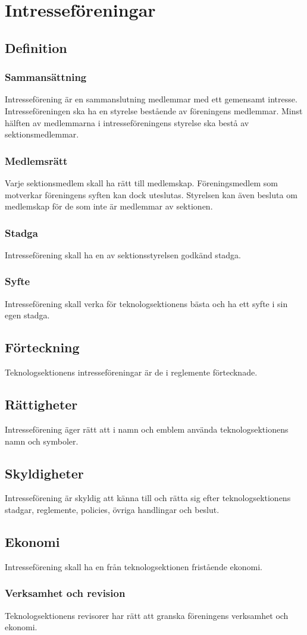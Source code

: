 \section{Intresseföreningar}

\subsection{Definition}

\subsubsection{Sammansättning}
Intresseförening är en sammanslutning medlemmar med ett gemensamt intresse. Intresseföreningen ska ha en styrelse bestående av föreningens medlemmar. Minst hälften av medlemmarna i intresseföreningens styrelse ska bestå av sektionsmedlemmar.

\subsubsection{Medlemsrätt}
Varje sektionsmedlem skall ha rätt till medlemskap. Föreningsmedlem som motverkar föreningens syften kan dock uteslutas. Styrelsen kan även besluta om medlemskap för de som inte är medlemmar av sektionen.

\subsubsection{Stadga}
Intresseförening skall ha en av sektionsstyrelsen godkänd stadga.

\subsubsection{Syfte}
Intresseförening skall verka för teknologsektionens bästa och ha ett syfte i sin egen stadga.

\subsection{Förteckning}
Teknologsektionens intresseföreningar är de i reglemente förtecknade.

\subsection{Rättigheter}
Intresseförening äger rätt att i namn och emblem använda teknologsektionens namn och symboler.

\subsection{Skyldigheter}
Intresseförening är skyldig att känna till och rätta sig efter teknologsektionens stadgar, reglemente, policies, övriga handlingar och beslut.

\subsection{Ekonomi}
Intresseförening skall ha en från teknologsektionen fristående ekonomi.

\subsubsection{Verksamhet och revision}
Teknologsektionens revisorer har rätt att granska föreningens verksamhet och ekonomi.